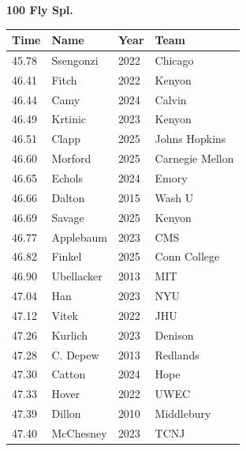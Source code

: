 \noindent\begin{minipage}[t]{0.98\textwidth}
\centering
\textbf{\textcolor{teamprimary}{100 Fly Spl.}}\par
\vspace{0.5em}
\centering
\small
\renewcommand{\arraystretch}{1.0}
\setlength{\tabcolsep}{4pt}
\begin{tabular}{@{}p{2.5cm}p{4.5cm}p{1.5cm}p{2.5cm}@{}}
\toprule
\textbf{Time} & \textbf{Name} & \textbf{Year} & \textbf{Team} \\
\midrule
45.78 & Ssengonzi & 2022 & Chicago \\
46.41 & Fitch & 2022 & Kenyon \\
46.44 & Camy & 2024 & Calvin \\
46.49 & Krtinic & 2023 & Kenyon \\
46.51 & Clapp & 2025 & Johns Hopkins \\
46.60 & Morford & 2025 & Carnegie Mellon \\
46.65 & Echols & 2024 & Emory \\
46.66 & Dalton & 2015 & Wash U \\
46.69 & Savage & 2025 & Kenyon \\
46.77 & Applebaum & 2023 & CMS \\
46.82 & Finkel & 2025 & Conn College \\
46.90 & Ubellacker & 2013 & MIT \\
47.04 & Han & 2023 & NYU \\
47.12 & Vitek & 2022 & JHU \\
47.26 & Kurlich & 2023 & Denison \\
47.28 & C. Depew & 2013 & Redlands \\
47.30 & Catton & 2024 & Hope \\
47.33 & Hover & 2022 & UWEC \\
47.39 & Dillon & 2010 & Middlebury \\
47.40 & McChesney & 2023 & TCNJ \\
\bottomrule
\end{tabular}
\end{minipage}
\vspace{1.2em}
